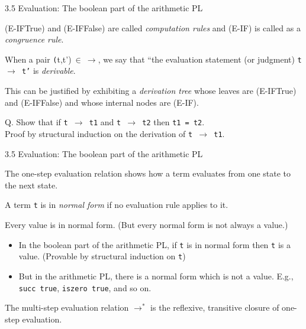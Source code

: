 \documentclass[table]{beamer}
\begin{document}
\begin{frame}[t]{3.5 Evaluation: The boolean part of the arithmetic PL} \vspace{10pt}

(E-IFTrue) and (E-IFFalse) are called {\it computation rules} and (E-IF) is called as a {\it congruence rule}.

\vspace{10pt}

When a pair \texttt(t,t')$\ \in \ \rightarrow$, we say that ``the evaluation statement (or judgment) \texttt{t $\rightarrow$ t'} is {\it derivable}. 

\vspace{10pt}

This can be justified by exhibiting a {\it derivation tree} whose leaves are (E-IFTrue) and (E-IFFalse) and whose internal nodes are (E-IF). 

\vspace{10pt}

Q. Show that if \texttt{t $\rightarrow$ t1} and \texttt{t $\rightarrow$ t2} then \texttt{t1 = t2}. \\
Proof by structural induction on the derivation of \texttt{t $\rightarrow$ t1}. 

\end{frame}

\begin{frame}[t]{3.5 Evaluation: The boolean part of the arithmetic PL} \vspace{10pt}

The one-step evaluation relation shows how a term evaluates from one state to the next state. 

\vspace{10pt}

A term \texttt{t} is in {\it normal form} if no evaluation rule applies to it. 

\vspace{10pt}

Every value is in normal form. (But every normal form is not always a value.)
\begin{itemize}
\item
In the boolean part of the arithmetic PL, if \texttt{t} is in normal form then \texttt{t} is a value. (Provable by structural induction on \texttt{t})

\item
But in the arithmetic PL, there is a normal form which is not a value. E.g., \texttt{succ true}, \texttt{iszero true}, and so on.
\end{itemize}

\vspace{10pt}

The multi-step evaluation relation $\rightarrow^*$ is the reflexive, transitive closure of one-step evaluation. 

\end{frame}
\end{document}

